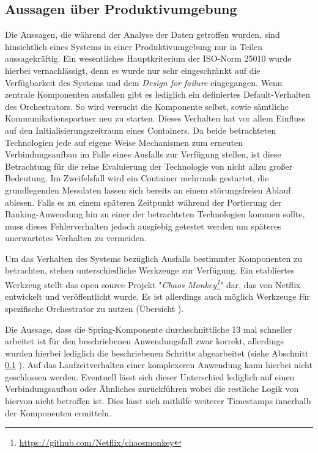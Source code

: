 \subsection{Aussagen über Produktivumgebung}
Die Aussagen, die während der Analyse der Daten getroffen wurden, sind hinsichtlich eines Systems in einer Produktivumgebung nur in Teilen aussagekräftig. Ein wesentliches Hauptkriterium der ISO-Norm 25010  wurde hierbei vernachlässigt, denn es wurde nur sehr eingeschränkt auf die Verfügbarkeit des Systems und dem \emph{Design for failure} eingegangen. Wenn zentrale Komponenten ausfallen gibt es lediglich ein definiertes Default-Verhalten des Orchestrators. So wird versucht die Komponente selbst, sowie sämtliche Kommunikationspartner neu zu starten. Dieses Verhalten hat vor allem Einfluss auf den Initialisierungszeitraum eines Containers. Da beide betrachteten Technologien jede auf eigene Weise Mechanismen zum erneuten Verbindungsaufbau im Falle eines Ausfalls zur Verfügung stellen, ist diese Betrachtung für die reine Evaluierung der Technologie von nicht allzu großer Bedeutung. Im Zweifelsfall wird ein Container mehrmals gestartet, die grundlegenden Messdaten lassen sich bereits an einem störungsfreien Ablauf ablesen. Falls es zu einem späteren Zeitpunkt während der Portierung der Banking-Anwendung hin zu einer der betrachteten Technologien kommen sollte, muss dieses Fehlerverhalten jedoch ausgiebig getestet werden um späteres unerwartetes Verhalten zu vermeiden. 

Um das Verhalten des Systems bezüglich Ausfalls bestimmter Komponenten zu betrachten, stehen unterschiedliche Werkzeuge zur Verfügung. Ein etabliertes Werkzeug stellt das open source Projekt "\emph{Chaos Monkey\footnote{\url{https://github.com/Netflix/chaosmonkey}}}" dar, das von Netflix entwickelt und veröffentlicht wurde. Es ist allerdings auch möglich Werkzeuge für spezifische Orchestrator zu nutzen (Übersicht \cite[Seite~369]{continous-delivery}).

Die Aussage, dass die Spring-Komponente durchschnittliche 13 mal schneller arbeitet ist für den beschriebenen Anwendungsfall zwar korrekt, allerdings wurden hierbei lediglich die beschriebenen Schritte abgearbeitet (siehe Abschnitt \ref{} ). Auf das Laufzeitverhalten einer komplexeren Anwendung kann hierbei nicht geschlossen werden. Eventuell lässt sich dieser Unterschied lediglich auf einen Verbindungsaufbau oder Ähnliches zurückführen wobei die restliche Logik von hiervon nicht betroffen ist. Dies lässt sich mithilfe weiterer Timestamps innerhalb der Komponenten ermitteln.


